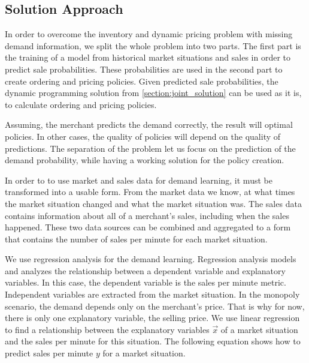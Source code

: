 

\subsection{Solution Approach}
In order to overcome the inventory and dynamic pricing problem with missing demand information, we split the whole problem into two parts.
The first part is the training of a model from historical market situations and sales in order to predict sale probabilities.
These probabilities are used in the second part to create ordering and pricing policies.
Given predicted sale probabilities, the dynamic programming solution from \cref{section:joint_solution} can be used as it is, to calculate ordering and pricing policies.

Assuming, the merchant predicts the demand correctly, the result will optimal policies.
In other cases, the quality of policies will depend on the quality of predictions. 
The separation of the problem let us focus on the prediction of the demand probability, while having a working solution for the policy creation.

In order to to use market and sales data for demand learning, it must be transformed into a usable form.
From the market data we know, at what times the market situation changed and what the market situation was.
The sales data contains information about all of a merchant's sales, including when the sales happened.
These two data sources can be combined and aggregated to a form that contains the number of sales per minute for each market situation.

We use regression analysis for the demand learning.
Regression analysis models and analyzes the relationship between a dependent variable and explanatory variables.
In this case, the dependent variable is the sales per minute metric.
Independent variables are extracted from the market situation.
In the monopoly scenario, the demand depends only on the merchant's price.
That is why for now, there is only one explanatory variable, the selling price.
We use linear regression to find a relationship between the explanatory variables $\vec{x}$ of a market situation and the sales per minute for this situation.
The following equation shows how to predict sales per minute $y$ for a market situation.

